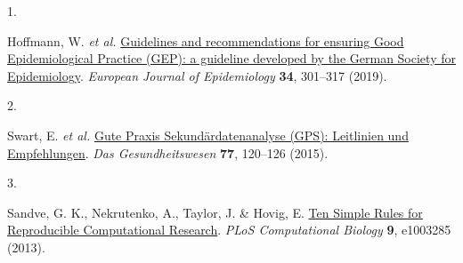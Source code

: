 \documentclass[
  letterpaper,
  DIV=11,
  numbers=noendperiod]{scrreprt}
\newlength{\cslhangindent}
\newlength{\csllabelwidth}
\newlength{\cslentryspacingunit} %
\newenvironment{CSLReferences}[2] %
 {%
  \setlength{\parindent}{0pt}
  \ifodd #1
  \let\oldpar\par
  \def\par{\hangindent=\cslhangindent\oldpar}
  \fi
  \setlength{\parskip}{#2\cslentryspacingunit}
 }%
 {}
\newcommand{\CSLLeftMargin}[1]{\parbox[t]{\csllabelwidth}{#1}}
\newcommand{\CSLRightInline}[1]{\parbox[t]{\linewidth - \csllabelwidth}{#1}\break}
\begin{document}
\hypertarget{refs}{}
\begin{CSLReferences}{0}{0}
\leavevmode{}%
\CSLLeftMargin{1. }%
\CSLRightInline{Hoffmann, W. \emph{et al.}
\href{https://doi.org/10.1007/s10654-019-00500-x}{Guidelines and
recommendations for ensuring Good Epidemiological Practice (GEP): a
guideline developed by the German Society for Epidemiology}.
\emph{European Journal of Epidemiology} \textbf{34}, 301--317 (2019).}

\leavevmode{}%
\CSLLeftMargin{2. }%
\CSLRightInline{Swart, E. \emph{et al.}
\href{https://doi.org/10.1055/s-0034-1396815}{Gute Praxis
Sekundärdatenanalyse (GPS): Leitlinien und Empfehlungen}. \emph{Das
Gesundheitswesen} \textbf{77}, 120--126 (2015).}

\leavevmode{}%
\CSLLeftMargin{3. }%
\CSLRightInline{Sandve, G. K., Nekrutenko, A., Taylor, J. \& Hovig, E.
\href{https://doi.org/10.1371/journal.pcbi.1003285}{Ten Simple Rules for
Reproducible Computational Research}. \emph{PLoS Computational Biology}
\textbf{9}, e1003285 (2013).}

\end{CSLReferences}
\end{document}
